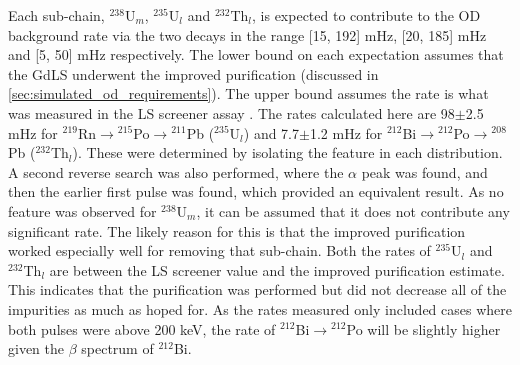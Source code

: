 \par
Each sub-chain, ${}^{238}$U$_{m}$, ${}^{235}$U$_{l}$ and ${}^{232}$Th$_{l}$, is expected to contribute to the OD background rate via the two decays in the range [15, 192] mHz, [20, 185] mHz and [5, 50] mHz respectively.
The lower bound on each expectation assumes that the GdLS underwent the improved purification (discussed in \autoref{sec:simulated_od_requirements}).
The upper bound assumes the rate is what was measured in the LS screener assay \cite{scotthaselschwardt_thesis_ref}.
The rates calculated here are 98$\pm$2.5 mHz for ${}^{219}$Rn$\to{}^{215}$Po$\to{}^{211}$Pb (${}^{235}$U$_{l}$) and 7.7$\pm$1.2 mHz for ${}^{212}$Bi$\to{}^{212}$Po$\to{}^{208}$Pb (${}^{232}$Th$_{l}$).
These were determined by isolating the feature in each distribution.
A second reverse search was also performed, where the $\alpha$ peak was found, and then the earlier first pulse was found, which provided an equivalent result.
As no feature was observed for ${}^{238}$U$_{m}$, it can be assumed that it does not contribute any significant rate.
The likely reason for this is that the improved purification worked especially well for removing that sub-chain.
Both the rates of ${}^{235}$U$_{l}$ and ${}^{232}$Th$_{l}$ are between the LS screener value and the improved purification estimate.
This indicates that the purification was performed but did not decrease all of the impurities as much as hoped for.
As the rates measured only included cases where both pulses were above 200 keV, the rate of ${}^{212}$Bi$\to{}^{212}$Po will be slightly higher given the $\beta$ spectrum of ${}^{212}$Bi. 

